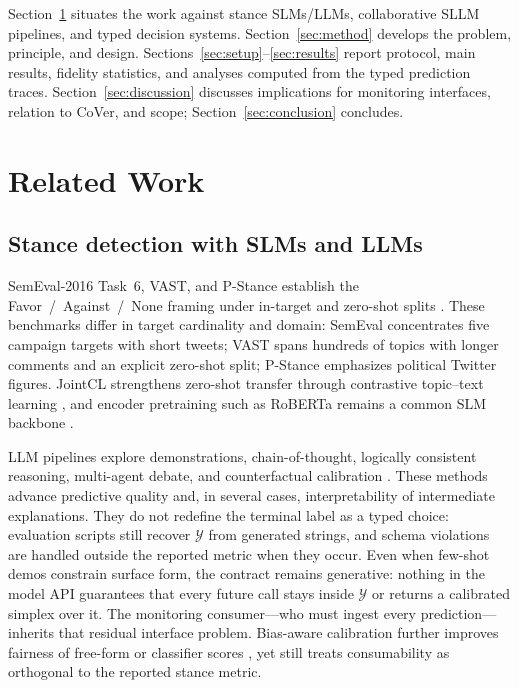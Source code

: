 \documentclass[10pt]{article}
\theoremstyle{definition}
\begin{document}
Section~\ref{sec:related} situates the work against stance SLMs/LLMs, collaborative SLLM pipelines, and typed
decision systems.
Section~\ref{sec:method} develops the problem, principle, and design.
Sections~\ref{sec:setup}--\ref{sec:results} report protocol, main results, fidelity statistics, and analyses
computed from the typed prediction traces.
Section~\ref{sec:discussion} discusses implications for monitoring interfaces, relation to CoVer, and scope;
Section~\ref{sec:conclusion} concludes.

\section{Related Work}
\label{sec:related}

\subsection{Stance detection with SLMs and LLMs}
SemEval-2016 Task~6, VAST, and P-Stance establish the Favor~/~Against~/~None framing under in-target and
zero-shot splits \cite{mohammad2016semeval,allaway2020vast,li2021pstance}.
These benchmarks differ in target cardinality and domain: SemEval concentrates five campaign targets with
short tweets; VAST spans hundreds of topics with longer comments and an explicit zero-shot split; P-Stance
emphasizes political Twitter figures.
JointCL strengthens zero-shot transfer through contrastive topic--text learning \cite{liang2022jointcl}, and
encoder pretraining such as RoBERTa remains a common SLM backbone \cite{liu2019roberta}.

LLM pipelines explore demonstrations, chain-of-thought, logically consistent reasoning, multi-agent debate,
and counterfactual calibration
\cite{zhang2022chatgptstance,zhang2023cotstance,zhang2023lccot,lan2024cola,li2024factual,wei2022cot}.
These methods advance predictive quality and, in several cases, interpretability of intermediate explanations.
They do not redefine the terminal label as a typed choice: evaluation scripts still recover $\mathcal{Y}$ from
generated strings, and schema violations are handled outside the reported metric when they occur.
Even when few-shot demos constrain surface form, the contract remains generative: nothing in the model API
guarantees that every future call stays inside $\mathcal{Y}$ or returns a calibrated simplex over it.
The monitoring consumer---who must ingest every prediction---inherits that residual interface problem.
Bias-aware calibration further improves fairness of free-form or classifier scores \cite{li2024factual}, yet
still treats consumability as orthogonal to the reported stance metric.
\end{document}
